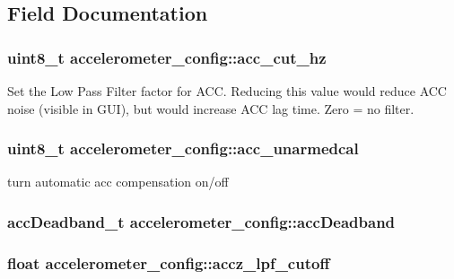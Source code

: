 \subsection{Field Documentation}
\hypertarget{structaccelerometer__config_a088e69038ebd93df5ae3c56ea472fd16}{
\subsubsection[{acc\+\_\+cut\+\_\+hz}]{\setlength{\rightskip}{0pt plus 5cm}uint8\+\_\+t accelerometer\+\_\+config\+::acc\+\_\+cut\+\_\+hz}}\label{structaccelerometer__config_a088e69038ebd93df5ae3c56ea472fd16}


Set the Low Pass Filter factor for A\+C\+C. Reducing this value would reduce A\+C\+C noise (visible in G\+U\+I), but would increase A\+C\+C lag time. Zero = no filter. 

\hypertarget{structaccelerometer__config_a21468aef3b31e5be80c762fcfca24b95}{
\subsubsection[{acc\+\_\+unarmedcal}]{\setlength{\rightskip}{0pt plus 5cm}uint8\+\_\+t accelerometer\+\_\+config\+::acc\+\_\+unarmedcal}}\label{structaccelerometer__config_a21468aef3b31e5be80c762fcfca24b95}


turn automatic acc compensation on/off 

\hypertarget{structaccelerometer__config_a8a2c31e3f9d037e05d3c0b41a12ee7b2}{
\subsubsection[{acc\+Deadband}]{\setlength{\rightskip}{0pt plus 5cm}acc\+Deadband\+\_\+t accelerometer\+\_\+config\+::acc\+Deadband}}\label{structaccelerometer__config_a8a2c31e3f9d037e05d3c0b41a12ee7b2}
\hypertarget{structaccelerometer__config_a5d59b4a4c6c7fa689a43ba076ea587de}{
\subsubsection[{accz\+\_\+lpf\+\_\+cutoff}]{\setlength{\rightskip}{0pt plus 5cm}float accelerometer\+\_\+config\+::accz\+\_\+lpf\+\_\+cutoff}}\label{structaccelerometer__config_a5d59b4a4c6c7fa689a43ba076ea587de}


